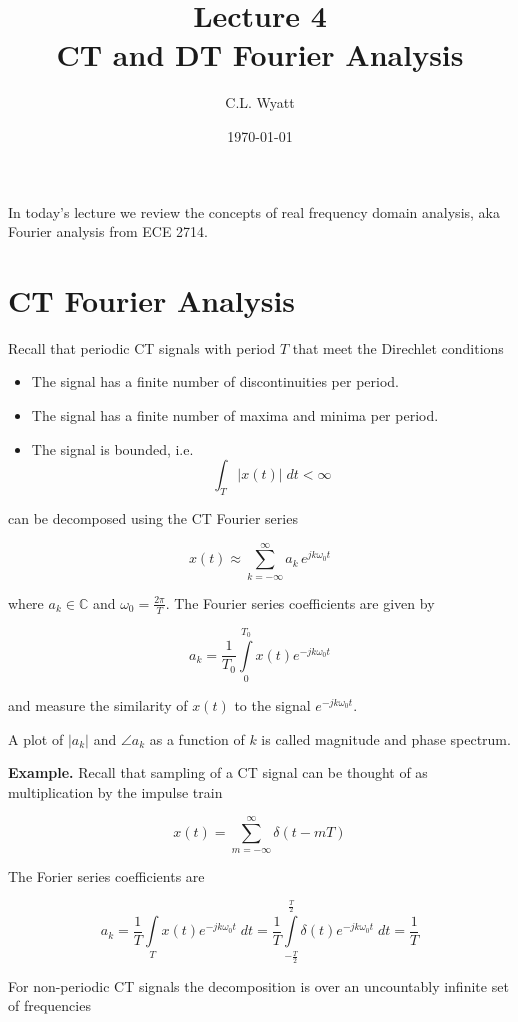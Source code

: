 \documentclass{article}
\begin{document}
\title{Lecture 4\\ CT and DT Fourier Analysis}
\author{C.L. Wyatt}
\date{\today}
\maketitle

In today's lecture we review the concepts of real frequency domain analysis, aka Fourier analysis from ECE 2714.

\section{CT Fourier Analysis}

Recall that periodic CT signals with period $T$ that meet the Direchlet conditions

\begin{itemize}
\item The signal has a finite number of discontinuities per period.
\item The signal has a finite number of maxima and minima per period.
\item The signal is bounded, i.e.
  \[
  \int_{T} |x(t)| \;dt < \infty
  \]
\end{itemize}

can be decomposed using the CT Fourier series

\[
x(t) \approx \sum\limits_{k = -\infty}^{\infty} a_k \, e^{j k\omega_0 t}
\]

where $a_k \in\mathbb{C}$ and $\omega_0 = \frac{2\pi}{T}$. The Fourier series coefficients are given by

\[
a_k = \frac{1}{T_0} \int\limits_{0}^{T_0} x(t)e^{-jk\omega_0 t}
\]

and measure the similarity of $x(t)$ to the signal $e^{-jk\omega_0 t}$.

A plot of $|a_k|$ and $\angle a_k$ as a function of $k$ is called magnitude and phase spectrum.

\textbf{Example.} Recall that sampling of a CT signal can be thought of as multiplication by the impulse train

\[
x(t) = \sum\limits_{m = -\infty}^{\infty} \delta(t-mT)
\]

The Forier series coefficients are

\[
  a_k = \frac{1}{T} \int\limits_{T} x(t)e^{-jk\omega_0 t} \; dt =  \frac{1}{T} \int\limits_{-\frac{T}{2}}^{\frac{T}{2}} \delta(t)e^{-jk\omega_0 t} \; dt = \frac{1}{T}
\]

For non-periodic CT signals the decomposition is over an uncountably infinite set of frequencies
\end{document}
